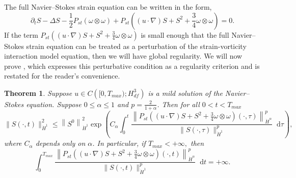 \documentclass[11pt]{article}
\theoremstyle{plain}
\newtheorem{theorem}{Theorem}[section]
\theoremstyle{remark}
\numberwithin{equation}{section}
\newcommand{\diff}{\mathop{}\!\mathrm{d}}
\begin{document}
The full Navier--Stokes strain equation can be written in the form,
\begin{equation}
    \partial_t S-\Delta S
    -\frac{1}{2}P_{st}\left(\omega\otimes\omega\right)
    +P_{st}\left((u\cdot\nabla)S+S^2
    +\frac{3}{4}\omega\otimes\omega\right)=0.
\end{equation}
If the term $P_{st}\left((u\cdot\nabla)S+S^2
    +\frac{3}{4}\omega\otimes\omega\right)$ is small enough that the full Navier--Stokes strain equation can be treated as a perturbation of the strain-vorticity interaction model equation, then we will have global regularity. We will now prove , which expresses this perturbative condition as a regularity criterion and is restated for the reader's convenience.


\begin{theorem} \label{StrainVortPerturbedRegCrit}
Suppose $u\in C\left([0,T_{max});H^3_{df}\right)$ is a mild solution of the Navier--Stokes equation.
Suppose $0\leq \alpha \leq 1$ and 
$p=\frac{2}{1+\alpha}$.
Then for all $0<t<T_{max}$
\begin{equation} \label{RegCritBound}
    \|S(\cdot,t)\|_{\dot{H}^1}^2
    \leq
    \left\|S^0 \right\|_{\dot{H}^1}^2
    \exp \left( C_\alpha \int_0^t
    \frac{\left\|P_{st}\left((u\cdot\nabla)S +S^2+\frac{3}{4}\omega\otimes\omega\right)
    (\cdot,\tau)\right\|_{\dot{H}^\alpha}^p}
    {\|S(\cdot,\tau)\|_{\dot{H}^1}^p} 
    \diff\tau \right),
\end{equation}
where $C_\alpha$ depends only on $\alpha$.
In particular, if $T_{max}<+\infty,$ then
\begin{equation}
    \int_0^{T_{max}}
    \frac{\left\|P_{st}\left((u\cdot\nabla)S +S^2+\frac{3}{4}\omega\otimes\omega\right)
    (\cdot,t)\right\|_{\dot{H}^\alpha}^p}
    {\|S(\cdot,t)\|_{\dot{H}^1}^p} \diff t 
    =+\infty.
\end{equation}
\end{theorem}
\end{document}
